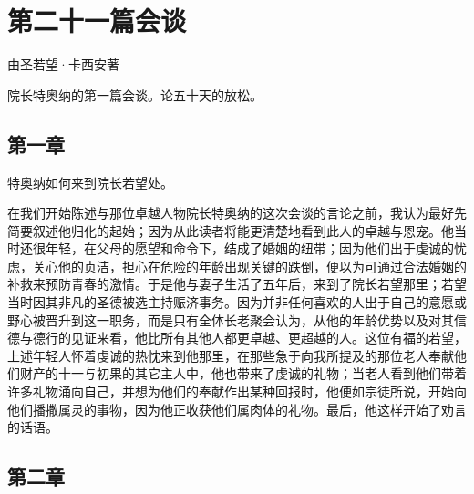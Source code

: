 

\section{第二十一篇会谈}

由圣若望·卡西安著\par

院长特奥纳的第一篇会谈。论五十天的放松。\par


\subsection{第一章}

特奥纳如何来到院长若望处。\par

在我们开始陈述与那位卓越人物院长特奥纳的这次会谈的言论之前，我认为最好先简要叙述他归化的起始；因为从此读者将能更清楚地看到此人的卓越与恩宠。他当时还很年轻，在父母的愿望和命令下，结成了婚姻的纽带；因为他们出于虔诚的忧虑，关心他的贞洁，担心在危险的年龄出现关键的跌倒，便以为可通过合法婚姻的补救来预防青春的激情。于是他与妻子生活了五年后，来到了院长若望那里；若望当时因其非凡的圣德被选主持赈济事务。因为并非任何喜欢的人出于自己的意愿或野心被晋升到这一职务，而是只有全体长老聚会认为，从他的年龄优势以及对其信德与德行的见证来看，他比所有其他人都更卓越、更超越的人。这位有福的若望，上述年轻人怀着虔诚的热忱来到他那里，在那些急于向我所提及的那位老人奉献他们财产的十一与初果的其它主人中，他也带来了虔诚的礼物；当老人看到他们带着许多礼物涌向自己，并想为他们的奉献作出某种回报时，他便如宗徒所说，开始向他们播撒属灵的事物，因为他正收获他们属肉体的礼物。最后，他这样开始了劝言的话语。\par


\subsection{第二章}

